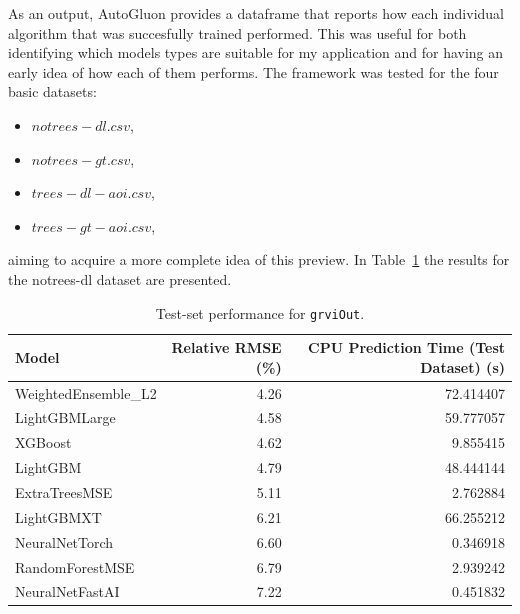 As an output, AutoGluon provides a dataframe that reports how each individual algorithm that was succesfully trained performed. This was useful for both identifying which models types are suitable for my application and for having an early idea of how each of them performs. The framework was tested for the four basic datasets:

\begin{itemize}
    \item $notrees-dl.csv$,
    \item $notrees-gt.csv$,
    \item $trees-dl-aoi.csv$,
    \item $trees-gt-aoi.csv$,
\end{itemize}

aiming to acquire a more complete idea of this preview. In Table~\ref{autogluon-perf-notrees-dl} the results for the notrees-dl dataset are presented. 

\begin{table}[htbp]
\centering
\begin{tabular}{|l|r|r|}
\hline
\textbf{Model} & \textbf{Relative RMSE (\%)}  & \textbf{CPU Prediction Time (Test Dataset) (s)} \\
\hline
WeightedEnsemble\_L2 & 4.26 &  72.414407 \\
\hline
LightGBMLarge        & 4.58 &  59.777057 \\
\hline
XGBoost              & 4.62 &   9.855415 \\
\hline
LightGBM             & 4.79 &  48.444144 \\
\hline
ExtraTreesMSE        & 5.11 &   2.762884 \\
\hline
LightGBMXT           & 6.21 &  66.255212 \\
\hline
NeuralNetTorch       & 6.60 &   0.346918 \\
\hline
RandomForestMSE      & 6.79 &   2.939242 \\
\hline
NeuralNetFastAI      & 7.22 &   0.451832 \\
\hline
\end{tabular}
\caption{Test-set performance for \texttt{grviOut}.}
\label{autogluon-perf-notrees-dl}
\end{table}


